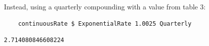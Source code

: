 \documentclass[11pt,a4paper]{article}
\numberwithin{equation}{section}
\begin{document}
	Instead, using a quarterly compounding with a value from table 3:

	\begin{lstlisting}
	continuousRate $ ExponentialRate 1.0025 Quarterly
	\end{lstlisting}
	\FrameSep
	\begin{lstlisting}[style=Output]
	2.714080846608224
	\end{lstlisting}

\end{document}
